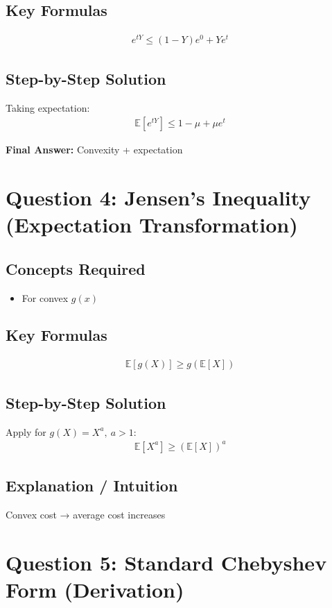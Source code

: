 \documentclass{article}
\begin{document}
\subsection{Key Formulas}
\begin{align}
e^{tY} \le (1-Y)e^0 + Ye^t
\end{align}

\subsection{Step-by-Step Solution}
Taking expectation:
\begin{align}
\mathbb{E}[e^{tY}] \le 1 - \mu + \mu e^t
\end{align}

\textbf{Final Answer:} Convexity + expectation

\section{Question 4: Jensen’s Inequality (Expectation Transformation)}

\subsection{Concepts Required}
\begin{itemize}
\item For convex $g(x)$
\end{itemize}

\subsection{Key Formulas}
\begin{align}
\mathbb{E}[g(X)] \ge g(\mathbb{E}[X])
\end{align}

\subsection{Step-by-Step Solution}
Apply for $g(X) = X^a,\ a > 1$:
\begin{align}
\mathbb{E}[X^a] \ge (\mathbb{E}[X])^a
\end{align}

\subsection{Explanation / Intuition}
Convex cost → average cost increases

\section{Question 5: Standard Chebyshev Form (Derivation)}
\end{document}
